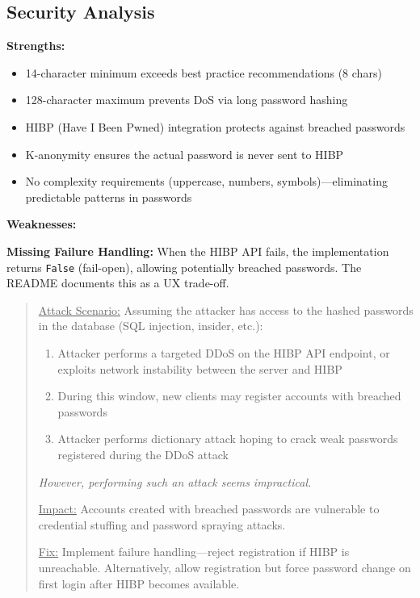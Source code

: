 \documentclass[11pt,a4paper]{article}
\begin{document}
\subsection{Security Analysis}

\textbf{Strengths:}
\begin{itemize}[noitemsep]
    \item 14-character minimum exceeds best practice recommendations (8 chars)
    \item 128-character maximum prevents DoS via long password hashing
    \item HIBP (Have I Been Pwned) integration protects against breached passwords
    \item K-anonymity ensures the actual password is never sent to HIBP
    \item No complexity requirements (uppercase, numbers, symbols)---eliminating predictable patterns in passwords
\end{itemize}

\textbf{Weaknesses:}

\textbf{Missing Failure Handling:} When the HIBP API fails, the implementation returns \texttt{False} (fail-open), allowing potentially breached passwords. The README documents this as a UX trade-off.

\begin{quote}
\underline{Attack Scenario:} Assuming the attacker has access to the hashed passwords in the database (SQL injection, insider, etc.):
\begin{enumerate}[noitemsep]
    \item Attacker performs a targeted DDoS on the HIBP API endpoint, or exploits network instability between the server and HIBP
    \item During this window, new clients may register accounts with breached passwords
    \item Attacker performs dictionary attack hoping to crack weak passwords registered during the DDoS attack
\end{enumerate}

\textit{However, performing such an attack seems impractical.}

\underline{Impact:} Accounts created with breached passwords are vulnerable to credential stuffing and password spraying attacks.

\underline{Fix:} Implement failure handling---reject registration if HIBP is unreachable. Alternatively, allow registration but force password change on first login after HIBP becomes available.
\end{quote}
\end{document}
